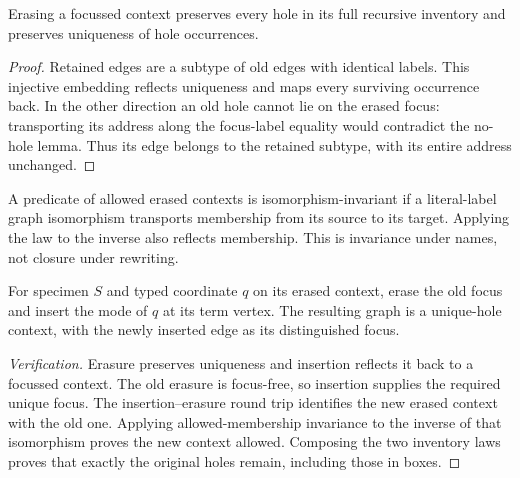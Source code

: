 


\begin{lemma}
Erasing a focussed context preserves every hole in its full recursive inventory
and preserves uniqueness of hole occurrences.
\end{lemma}
\begin{proof}
Retained edges are a subtype of old edges with identical labels. This injective
embedding reflects uniqueness and maps every surviving occurrence back. In the
other direction an old hole cannot lie on the erased focus: transporting its
address along the focus-label equality would contradict the no-hole lemma.
Thus its edge belongs to the retained subtype, with its entire address unchanged.
\end{proof}



\begin{definition}
A predicate of allowed erased contexts is isomorphism-invariant if a literal-label
graph isomorphism transports membership from its source to its target.
Applying the law to the inverse also reflects membership. This is invariance
under names, not closure under rewriting.
\end{definition}


\begin{definition}
For specimen $S$ and typed coordinate $q$ on its erased context, erase the old
focus and insert the mode of $q$ at its term vertex. The resulting graph is a
unique-hole context, with the newly inserted edge as its distinguished focus.
\end{definition}
\begin{proof}[Verification]
Erasure preserves uniqueness and insertion reflects it back to a focussed
context. The old erasure is focus-free, so insertion supplies the required
unique focus. The insertion--erasure round trip identifies the new erased
context with the old one. Applying allowed-membership invariance to the inverse
of that isomorphism proves the new context allowed. Composing the two inventory
laws proves that exactly the original holes remain, including those in boxes.
\end{proof}

